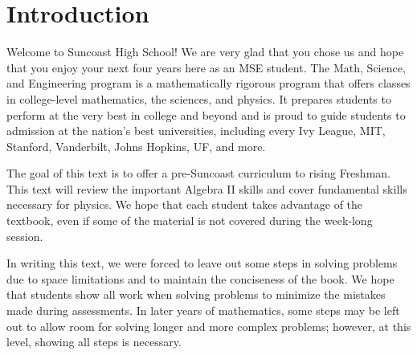 \documentclass[../book.tex]{subfiles}
\begin{document}
\chapter{Introduction}
Welcome to Suncoast High School!  We are very glad that you chose us and hope that you enjoy your next four years here as an MSE student.  The Math, Science, and Engineering program is a mathematically rigorous program that offers classes in college-level mathematics, the sciences, and physics.  It prepares students to perform at the very best in college and beyond and is proud to guide students to admission at the nation's best universities, including every Ivy League, MIT, Stanford, Vanderbilt, Johns Hopkins, UF, and more.

The goal of this text is to offer a pre-Suncoast curriculum to rising Freshman.  This text will review the important Algebra II skills and cover fundamental skills necessary for physics.  We hope that each student takes advantage of the textbook, even if some of the material is not covered during the week-long session.

In writing this text, we were forced to leave out some steps in solving problems due to space limitations and to maintain the conciseness of the book.  We hope that students show all work when solving problems to minimize the mistakes made during assessments.  In later years of mathematics, some steps may be left out to allow room for solving longer and more complex problems; however, at this level, showing all steps is necessary.
\end{document}
